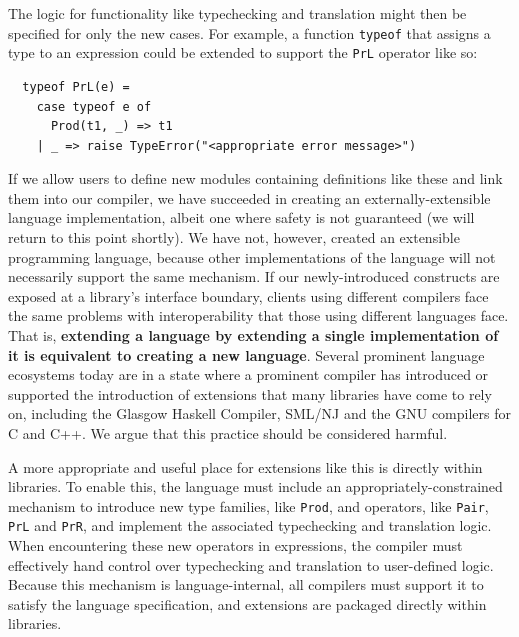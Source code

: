 \documentclass{llncs}
\begin{document}
The logic for functionality like typechecking and translation might then be specified for only the new cases. For example, a function \lstinline{typeof} that assigns a type to an expression could be extended to support the \lstinline{PrL} operator like so:
\begin{lstlisting}
  typeof PrL(e) = 
    case typeof e of 
      Prod(t1, _) => t1 
    | _ => raise TypeError("<appropriate error message>")
\end{lstlisting}

If we allow users to define new modules containing definitions like these and link them into our compiler, we have succeeded in creating an externally-extensible language implementation, albeit one where safety is not guaranteed (we will return to this point shortly). We have not, however, created an extensible programming language, because other implementations of the language will not necessarily support the same mechanism. 
If our newly-introduced constructs are exposed at a library's  interface boundary, clients using different compilers face the same problems with interoperability that those using different languages face. That is, \textbf{extending a language by extending a single implementation of it is equivalent to creating a new language}. Several prominent language ecosystems today are in a state where a prominent compiler has introduced or supported the introduction of extensions that many libraries have come to rely on, including the Glasgow Haskell Compiler, SML/NJ and the GNU compilers for C and C++. We argue that this practice should be considered harmful.

A more appropriate and useful place for extensions like this is directly within libraries. To enable this, the language must include an appropriately-constrained mechanism to introduce new type families, like \lstinline{Prod}, and operators, like \lstinline{Pair}, \lstinline{PrL} and \lstinline{PrR}, and implement the associated typechecking and translation logic. When encountering these new operators in expressions, the compiler must effectively  hand control over typechecking and translation to user-defined logic. Because this mechanism is {language-internal}, all compilers must support it to satisfy the language specification, and extensions are packaged directly within  libraries.
\end{document}
